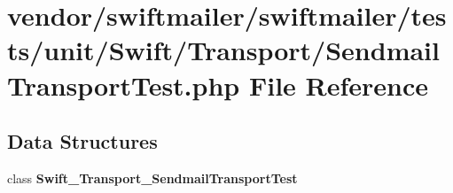 \section{vendor/swiftmailer/swiftmailer/tests/unit/\+Swift/\+Transport/\+Sendmail\+Transport\+Test.php File Reference}
\label{_sendmail_transport_test_8php}
\subsection*{Data Structures}
\begin{DoxyCompactItemize}
\item 
class {\bf Swift\+\_\+\+Transport\+\_\+\+Sendmail\+Transport\+Test}
\end{DoxyCompactItemize}
